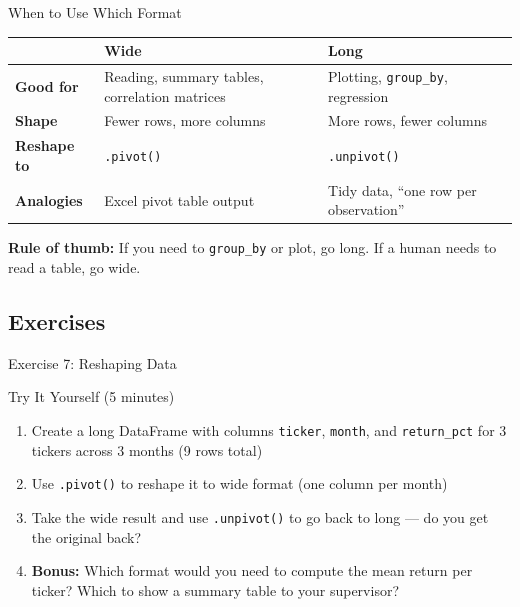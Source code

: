 \documentclass[9pt,aspectratio=169]{beamer}
\newcommand{\py}[1]{\lstinline[language=Python]{#1}}
\begin{document}
\begin{frame}{When to Use Which Format}

\begin{tabular}{@{}lp{5cm}p{5cm}@{}}
\toprule
 & \textbf{Wide} & \textbf{Long} \\
\midrule
\textbf{Good for} & Reading, summary tables, correlation matrices & Plotting, \texttt{group\_by}, regression \\[0.5em]
\textbf{Shape} & Fewer rows, more columns & More rows, fewer columns \\[0.5em]
\textbf{Reshape to} & \texttt{.pivot()} & \texttt{.unpivot()} \\[0.5em]
\textbf{Analogies} & Excel pivot table output & Tidy data, ``one row per observation'' \\
\bottomrule
\end{tabular}

\bigskip

\begin{highlightbox}
\centering
\textbf{Rule of thumb:} If you need to \texttt{group\_by} or plot, go long. If a human needs to read a table, go wide.
\end{highlightbox}

\end{frame}


\subsection{Exercises}
\begin{frame}[fragile]{Exercise 7: Reshaping Data}

\begin{alertblock}{Try It Yourself (5 minutes)}
\begin{enumerate}
    \item Create a long DataFrame with columns \texttt{ticker}, \texttt{month}, and \texttt{return\_pct} for 3 tickers across 3 months (9 rows total)
    \item Use \py{.pivot()} to reshape it to wide format (one column per month)
    \item Take the wide result and use \py{.unpivot()} to go back to long --- do you get the original back?
    \item \textbf{Bonus:} Which format would you need to compute the mean return per ticker? Which to show a summary table to your supervisor?
\end{enumerate}
\end{alertblock}

\end{frame}
\end{document}
